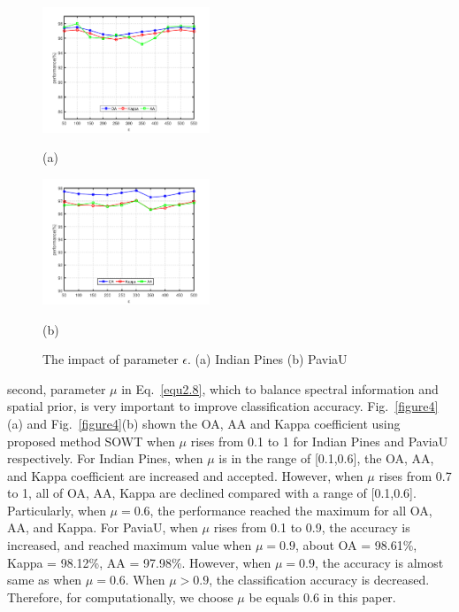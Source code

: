 \documentclass{ws-ijwmip}
\begin{document}
      \begin{figure}[bh]
        \centering
        \begin{minipage}[b]{0.45\linewidth}
            \centering
            \centerline{
            \includegraphics[width=5cm ]{image/indianPines_emsou}}
            \centerline{(a)}
            \medskip
        \end{minipage}
        \begin{minipage}[b]{0.45\linewidth}
            \centering
            \centerline{
            \includegraphics[width=5cm ]{image/paviaU_emsou}}
            \centerline{(b)}
            \medskip
        \end{minipage}
        \caption{The impact of parameter $\epsilon$. (a) Indian Pines  (b) PaviaU}
        \label{figure5}
    \end{figure}

second, parameter $\mu$ in Eq.~\ref{equ2.8}, which to balance spectral information and spatial prior, is very important to improve classification accuracy. Fig.~\ref{figure4}(a) and Fig.~\ref{figure4}(b) shown the OA, AA and Kappa coefficient using proposed method SOWT when $\mu$ rises from 0.1 to 1 for Indian Pines and PaviaU respectively. For Indian Pines, when $\mu$ is in the range of [0.1,0.6], the OA, AA, and Kappa coefficient are increased and accepted. However, when $\mu$ rises from 0.7 to 1, all of OA, AA, Kappa are declined compared with a range of [0.1,0.6]. Particularly, when $\mu = 0.6$, the performance reached the maximum for all OA, AA, and Kappa. For PaviaU, when $\mu$ rises from 0.1 to 0.9, the accuracy is increased, and reached maximum value when $\mu=0.9$, about OA = 98.61\%, Kappa = 98.12\%, AA = 97.98\%. However, when $\mu = 0.9$, the accuracy is almost same as when $\mu = 0.6$. When $\mu>0.9$, the classification accuracy is decreased. Therefore, for computationally, we choose $\mu$ be equals 0.6 in this paper.
\end{document}
